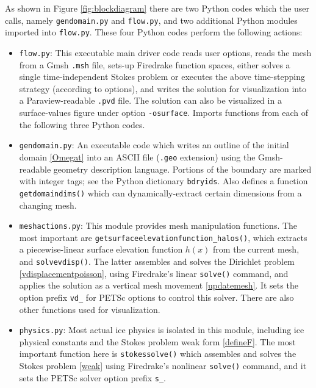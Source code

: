 \documentclass[letterpaper,final,12pt,reqno]{amsart}
\begin{document}
\medskip
As shown in Figure \ref{fig:blockdiagram} there are two Python codes which the user calls, namely \texttt{gendomain.py} and \texttt{flow.py}, and two additional Python modules imported into \texttt{flow.py}.  These four Python codes perform the following actions:
\begin{itemize}
\item \texttt{flow.py}: \quad  This executable main driver code reads user options, reads the mesh from a Gmsh \texttt{.msh} file, sets-up Firedrake function spaces, either solves a single time-independent Stokes problem or executes the above time-stepping strategy (according to options), and writes the solution for visualization into a Paraview-readable \texttt{.pvd} file.  The solution can also be visualized in a surface-values figure under option \texttt{-osurface}.  Imports functions from each of the following three Python codes.
\item \texttt{gendomain.py}: \quad  An executable code which writes an outline of the initial domain \eqref{Omegat} into an ASCII file (\texttt{.geo} extension) using the Gmsh-readable geometry description language.  Portions of the boundary are marked with integer tags; see the Python dictionary \texttt{bdryids}.  Also defines a function \texttt{getdomaindims()} which can dynamically-extract certain dimensions from a changing mesh.
\item \texttt{meshactions.py}: \quad  This module provides mesh manipulation functions.  The most important  are \texttt{getsurfaceelevationfunction\_halos()}, which extracts a piecewise-linear surface elevation function $h(x)$ from the current mesh, and \texttt{solvevdisp()}.  The latter assembles and solves the Dirichlet problem \eqref{vdisplacementpoisson}, using Firedrake's linear \texttt{solve()} command, and applies the solution as a vertical mesh movement \eqref{updatemesh}.  It sets the option prefix \texttt{vd\_} for PETSc options to control this solver.  There are also other functions used for visualization.
\item \texttt{physics.py}: \quad  Most actual ice physics is isolated in this module, including ice physical constants and the Stokes problem weak form \eqref{defineF}.  The most important function here is \texttt{stokessolve()} which assembles and solves the Stokes problem \eqref{weak} using Firedrake's nonlinear \texttt{solve()} command, and it sets the PETSc solver option prefix \texttt{s\_}.
\end{itemize}
\end{document}
